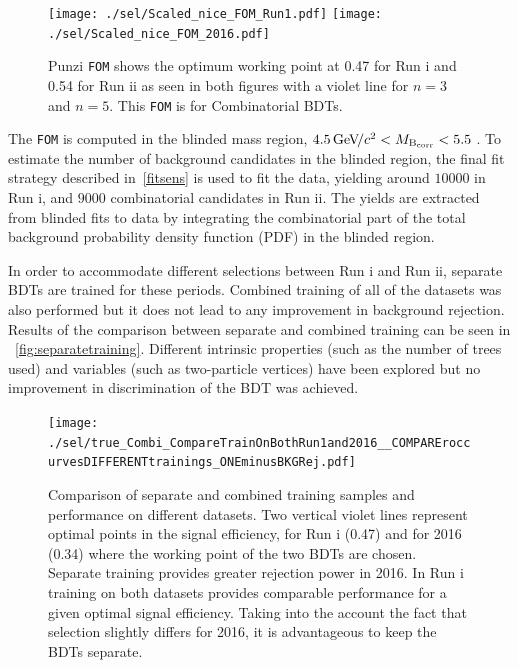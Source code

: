 \begin{figure}[ht]
\centering
	\texttt{[image: ./sel/Scaled\_nice\_FOM\_Run1.pdf]}%
	\texttt{[image: ./sel/Scaled\_nice\_FOM\_2016.pdf]}%
	\caption{ Punzi \texttt{FOM} shows the optimum working point at 0.47 for Run \Rn{1} and 0.54 for Run \Rn{2} as seen in both figures with a violet line for $n=3$ and $n=5$. This \texttt{FOM} is for Combinatorial BDTs.}
\label{fig:punzifom}
\end{figure}


The \texttt{FOM} is computed in the blinded mass region, $4.5{\mathrm{\,Ge\kern -0.1em V\!/}c^2} <M_{\mathrm{B_{corr}}} <5.5$ \gevcc. To estimate the number of background candidates in the blinded region, the final fit strategy described in~\autoref{fitsens} is used to fit the data, yielding around $10000$ in Run \Rn{1}, and $9000$ combinatorial candidates in Run \Rn{2}. The yields are extracted from blinded fits to data by integrating the combinatorial part of the total background probability density function (PDF) in the blinded region.

In order to accommodate different selections between Run \Rn{1} and Run \Rn{2}, separate BDTs are trained for these periods. Combined training of all of the datasets was also performed but it does not lead to any improvement in background rejection. Results of the comparison between separate and combined training can be seen in ~\autoref{fig:separatetraining}. Different intrinsic properties (such as the number of trees used) and variables (such as two-particle vertices) have been explored but no improvement in discrimination of the BDT was achieved.


\begin{figure}[ht]
\centering
\texttt{[image: ./sel/true\_Combi\_CompareTrainOnBothRun1and2016\_\_COMPAREroccurvesDIFFERENTtrainings\_ONEminusBKGRej.pdf]}
	\caption{Comparison of separate and combined training samples and performance on different datasets. Two vertical violet lines represent optimal points in the signal efficiency, for Run \Rn{1} (0.47) and for 2016 (0.34) where the working point of the two BDTs are chosen. Separate training provides greater rejection power in 2016. In Run \Rn{1} training on both datasets provides comparable performance for a given optimal signal efficiency. Taking into the account the fact that selection slightly differs for 2016, it is advantageous to keep the BDTs separate.}
\label{fig:separatetraining}
\end{figure}




